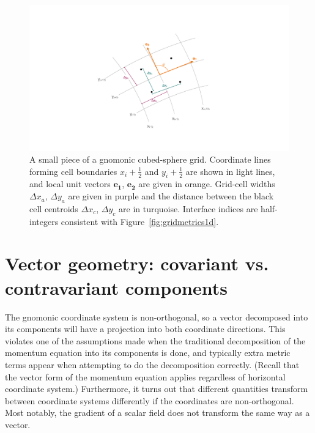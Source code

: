 \documentclass[10pt,letterpaper,margin=1in]{memoir}
\newcommand{\half}{\frac{1}{2}}
\begin{document}
\begin{figure}[tbp]
   \centering
   \includegraphics[scale=0.3]{gridmetricsCoordinates.pdf} %
   \caption{A small piece of a gnomonic cubed-sphere grid. Coordinate lines forming cell boundaries $x_i+\half$ and $y_i+\half$ are shown in light lines, and local unit vectors $\mathbf{e_1}$, $\mathbf{e_2}$ are given in orange. Grid-cell widths $\Delta x_a$, $\Delta y_a$ are given in purple and the distance between the black cell centroids $\Delta x_c$, $\Delta y_c$ are in turquoise. Interface indices are half-integers consistent with Figure~\ref{fig:gridmetrics1d}.}
   \label{fig:gridmetricsCoordinates}
\end{figure}

\section{Vector geometry: covariant vs. contravariant components} \label{sec:covarcontravar}

The gnomonic coordinate system is non-orthogonal, so a vector decomposed into its components will have a projection into both coordinate directions. This violates one of the assumptions made when the traditional decomposition of the momentum equation into its components is done, and typically extra metric terms appear when attempting to do the decomposition correctly. (Recall that the vector form of the momentum equation applies regardless of horizontal coordinate system.) Furthermore, it turns out that different quantities transform between coordinate systems differently if the coordinates are non-orthogonal. Most notably, the gradient of a scalar field does not transform the same way as a vector.
\end{document}

